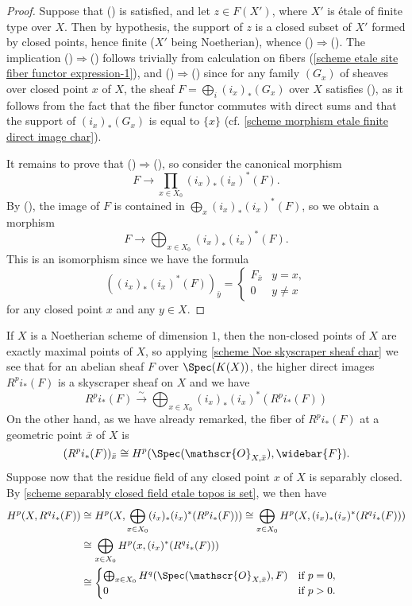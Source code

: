 \begin{proof}
Suppose that () is satisfied, and let $z\in F(X')$, where $X'$ is \'etale of finite type over $X$. Then by hypothesis, the support of $z$ is a closed subset of $X'$ formed by closed points, hence finite ($X'$ being Noetherian), whence ()$\Rightarrow$(). The implication ()$\Rightarrow$() follows trivially from calculation on fibers (\cref{scheme etale site fiber functor expression-1}), and ()$\Rightarrow$() since for any family $(G_x)$ of sheaves over closed point $x$ of $X$, the sheaf $F=\bigoplus_i(i_x)_*(G_x)$ over $X$ satisfies (), as it follows from the fact that the fiber functor commutes with direct sums and that the support of $(i_x)_*(G_x)$ is equal to $\{x\}$ (cf. \cref{scheme morphism etale finite direct image char}).\par
It remains to prove that ()$\Rightarrow$(), so consider the canonical morphism
\[F\to \prod_{x\in X_0}(i_x)_*(i_x)^*(F).\]
By (), the image of $F$ is contained in $\bigoplus_x(i_x)_*(i_x)^*(F)$, so we obtain a morphism
\[F\to\bigoplus_{x\in X_0}(i_x)_*(i_x)^*(F).\]
This is an isomorphism since we have the formula
\[((i_x)_*(i_x)^*(F))_{\bar{y}}=\begin{cases}
F_{\bar{x}}&y=x,\\
0&y\neq x
\end{cases}\]
for any closed point $x$ and any $y\in X$.
\end{proof}

If $X$ is a Noetherian scheme of dimension $1$, then the non-closed points of $X$ are exactly maximal points of $X$, so applying \cref{scheme Noe skyscraper sheaf char} we see that for an abelian sheaf $F$ over $\Spec(K(X))$, the higher direct images $R^pi_*(F)$ is a skyscraper sheaf on $X$ and we have
\[R^pi_*(F) \stackrel{\sim}{\to} \bigoplus_{x\in X_0}(i_x)_*(i_x)^*(R^pi_*(F))\]
On the other hand, as we have already remarked, the fiber of $R^pi_*(F)$ at a geometric point $\bar{x}$ of $X$ is 
\[(R^pi_*(F))_{\bar{x}}\cong H^p(\Spec(\mathscr{O}_{X,\bar{x}}),\widebar{F}).\]
Suppose now that the residue field of any closed point $x$ of $X$ is separably closed. By \cref{scheme separably closed field etale topos is set}, we then have
\begin{align*}
H^p(X,R^qi_*(F))&\cong H^p(X,\bigoplus_{x\in X_0}(i_x)_*(i_x)^*(R^pi_*(F)))\cong \bigoplus_{x\in X_0}H^p(X,(i_x)_*(i_x)^*(R^qi_*(F)))\\
&\cong \bigoplus_{x\in X_0}H^p(x,(i_x)^*(R^qi_*(F)))\\
&\cong\begin{cases}
\bigoplus_{x\in X_0}H^q(\Spec(\mathscr{O}_{X,\bar{x}}),F)&\text{if $p=0$},\\
0&\text{if $p>0$}.
\end{cases}
\end{align*}

